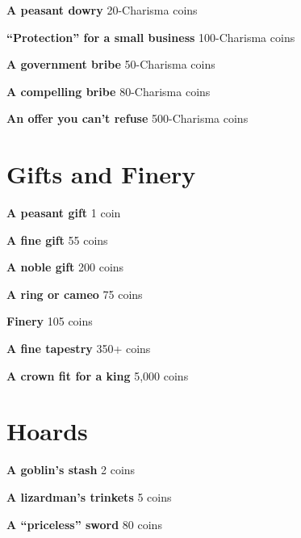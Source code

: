 {\noindent \bfseries A peasant dowry} \hspace*{\fill} 20-Charisma coins

{\noindent \bfseries ``Protection'' for a small business} \hspace*{\fill} 100-Charisma coins

{\noindent \bfseries A government bribe} \hspace*{\fill} 50-Charisma coins

{\noindent \bfseries A compelling bribe} \hspace*{\fill} 80-Charisma coins

{\noindent \bfseries An offer you can't refuse} \hspace*{\fill} 500-Charisma coins
\section*{Gifts and Finery}

{\noindent \bfseries A peasant gift} \hspace*{\fill} 1 coin

{\noindent \bfseries A fine gift} \hspace*{\fill} 55 coins

{\noindent \bfseries A noble gift} \hspace*{\fill} 200 coins

{\noindent \bfseries A ring or cameo} \hspace*{\fill} 75 coins

{\noindent \bfseries Finery} \hspace*{\fill} 105 coins

{\noindent \bfseries A fine tapestry} \hspace*{\fill} 350+ coins

{\noindent \bfseries A crown fit for a king} \hspace*{\fill} 5,000 coins
\section*{Hoards}

{\noindent \bfseries A goblin's stash} \hspace*{\fill} 2 coins

{\noindent \bfseries A lizardman's trinkets} \hspace*{\fill} 5 coins

{\noindent \bfseries A ``priceless'' sword} \hspace*{\fill} 80 coins

